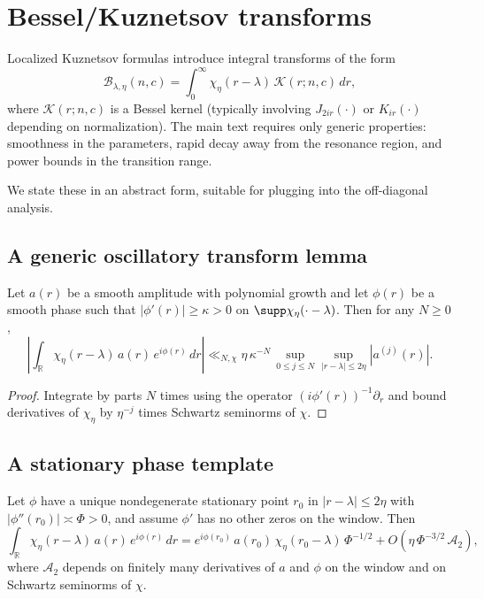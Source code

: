\section{Bessel/Kuznetsov transforms}
\label{sec:B.bessel}

Localized Kuznetsov formulas introduce integral transforms of the form
\[
\mathcal{B}_{\lambda,\eta}(n,c)
=
\int_0^\infty \chi_\eta(r-\lambda)\,\mathcal{K}(r; n,c)\,dr,
\]
where $\mathcal{K}(r;n,c)$ is a Bessel kernel (typically involving $J_{2ir}(\cdot)$ or $K_{ir}(\cdot)$ depending on
normalization).  The main text requires only generic properties: smoothness in the parameters, rapid decay away from
the resonance region, and power bounds in the transition range.

We state these in an abstract form, suitable for plugging into the off-diagonal analysis.

\subsection{A generic oscillatory transform lemma}
\label{subsec:B.oscillatory-lemma}

\begin{lemma}
\label{lem:B.oscillatory-nonstat}
Let $a(r)$ be a smooth amplitude with polynomial growth and let $\phi(r)$ be a smooth phase such that
$|\phi'(r)|\ge \kappa>0$ on $\supp \chi_\eta(\cdot-\lambda)$.
Then for any $N\ge 0$,
\begin{equation}
\label{eq:B.oscillatory-nonstat}
\left|
\int_{\mathbb{R}} \chi_\eta(r-\lambda)\,a(r)\,e^{i\phi(r)}\,dr
\right|
\ll_{N,\chi}
\eta\,\kappa^{-N}\,\sup_{0\le j\le N}\sup_{|r-\lambda|\le 2\eta}\left|a^{(j)}(r)\right|.
\end{equation}
\end{lemma}

\begin{proof}
Integrate by parts $N$ times using the operator $(i\phi'(r))^{-1}\partial_r$ and bound derivatives of $\chi_\eta$ by
$\eta^{-j}$ times Schwartz seminorms of $\chi$.
\end{proof}

\subsection{A stationary phase template}
\label{subsec:B.stationary-template}

\begin{lemma}
\label{lem:B.stationary-template}
Let $\phi$ have a unique nondegenerate stationary point $r_0$ in $|r-\lambda|\le 2\eta$ with
$|\phi''(r_0)|\asymp \Phi>0$, and assume $\phi'$ has no other zeros on the window.
Then
\begin{equation}
\label{eq:B.stationary-template}
\int_{\mathbb{R}} \chi_\eta(r-\lambda)\,a(r)\,e^{i\phi(r)}\,dr
=
e^{i\phi(r_0)}\,a(r_0)\,\chi_\eta(r_0-\lambda)\,\Phi^{-1/2}
+
O\!\left(\eta\,\Phi^{-3/2}\,\mathcal{A}_2\right),
\end{equation}
where $\mathcal{A}_2$ depends on finitely many derivatives of $a$ and $\phi$ on the window and on Schwartz seminorms
of $\chi$.
\end{lemma}

